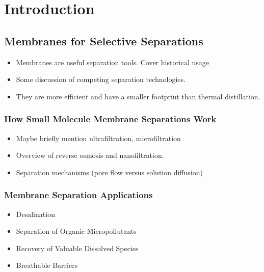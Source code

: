 \chapter{Introduction}\label{chapter:intro}

  \section{Membranes for Selective Separations}
  
  \begin{itemize}
  
    \item Membranes are useful separation tools. Cover historical usage
	\item Some discussion of competing separation technologies. 
	\item They are more efficient and have a smaller footprint than thermal distillation.
        
  \end{itemize}
  
  \subsection{How Small Molecule Membrane Separations Work}
  
  \begin{itemize}
  
    \item Maybe briefly mention ultrafiltration, microfiltration
    \item Overview of reverse osmosis and nanofiltration.
    \item Separation mechanisms (pore flow versus solution diffusion)
  
  \end{itemize}
  
  \subsection{Membrane Separation Applications}
  
  \begin{itemize}
  	\item Desalination
  	\item Separation of Organic Micropollutants
  	\item Recovery of Valuable Dissolved Species
  	\item Breathable Barriers
  \end{itemize}

